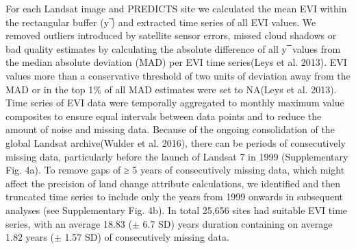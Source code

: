 For each Landsat image and PREDICTS site we calculated the mean EVI within the rectangular buffer (y ̅) and extracted time series of all EVI values. We removed outliers introduced by satellite sensor errors, missed cloud shadows or bad quality estimates by calculating the absolute difference of all y ̅ values from the median absolute deviation (MAD) per EVI time series(Leys et al. 2013). EVI values more than a conservative threshold of two units of deviation away from the MAD or in the top 1\% of all MAD estimates were set to NA(Leys et al. 2013). Time series of EVI data were temporally aggregated to monthly maximum value composites to ensure equal intervals between data points and to reduce the amount of noise and missing data. Because of the ongoing consolidation of the global Landsat archive(Wulder et al. 2016), there can be periods of consecutively missing data, particularly before the launch of Landsat 7 in 1999 (Supplementary Fig. 4a). To remove gaps of ≥ 5 years of consecutively missing data, which might affect the precision of land change attribute calculations, we identified and then truncated time series to include only the years from 1999 onwards in subsequent analyses (see Supplementary Fig. 4b). In total 25,656 sites had suitable EVI time series, with an average 18.83 ($\pm$ 6.7 SD) years duration containing on average 1.82 years ($\pm$ 1.57 SD) of consecutively missing data.

